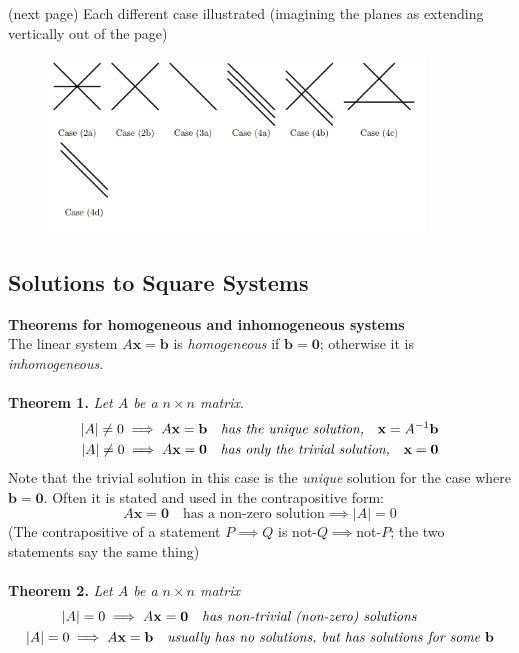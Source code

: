 \documentclass{report}
\begin{document}
(next page)
\newpage
\noindent Each different case illustrated (imagining the planes as extending 
vertically out of the page)
\begin{figure}[h]
\includegraphics[width=10cm]{Capture86}\\
\centering
\end{figure}
\newpage

\subsection{Solutions to Square Systems} %
\textbf{Theorems for homogeneous and inhomogeneous systems}\\
The linear system $A\mathbf{x=b}$ is \textit{homogeneous} if $\mathbf{b=0}$; otherwise 
it is \textit{inhomogeneous}.\\
\vspace{1mm}\\
\textbf{Theorem 1.} \textit{Let $A$ be a $n\times n$ matrix}.
\begin{align*}
|A|\neq0\implies A\mathbf{x=b}\quad\text{\textit{has the unique solution,}}
\quad\mathbf{x}=A^{-1}\mathbf{b}\\
|A|\neq0\implies A\mathbf{x=0}\quad\text{\textit{has only the trivial solution,}}
\quad\mathbf{x=0}\\
\end{align*}
Note that the trivial solution in this case is the \textit{unique} solution for the 
case where $\mathbf{b=0}$. Often it is stated and used in the contrapositive form:
\begin{equation*}
A\mathbf{x=0}\quad\text{has a non-zero solution}\implies|A|=0
\end{equation*} 
(The contrapositive of a statement $P\implies Q$ is not-$Q\implies$not-$P$; the two
statements say the same thing)\\
\vspace{1mm}\\
\textbf{Theorem 2.} \textit{Let $A$ be a $n\times n$ matrix}
\begin{align*}
|A|=0\implies A&\mathbf{x=0}\quad\text{\textit{has non-trivial (non-zero) solutions}}\\
|A|=0\implies A\mathbf{x=b}&\quad\text{\textit{usually has no solutions, but has solutions
for some $\mathbf{b}$}}
\end{align*}
\end{document}
